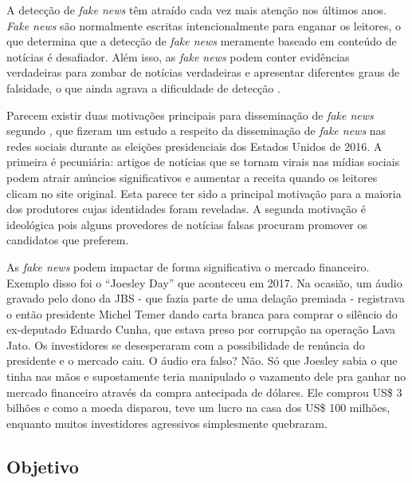 A  detecção de \textit{fake news} têm atraído cada vez mais atenção nos últimos anos. \textit{Fake news} são normalmente escritas intencionalmente para enganar os leitores, o que determina que a detecção de \textit{fake news} meramente baseado em conteúdo de notícias é  desafiador.
Além isso, as \textit{fake news} podem conter evidências verdadeiras para zombar de notícias verdadeiras e apresentar diferentes graus de falsidade, o que ainda agrava a dificuldade de detecção \cite{karimi2018}. 

Parecem existir duas motivações principais para disseminação de \textit{fake news} segundo \citet{allcot2017}, que fizeram um estudo a respeito da disseminação de \textit{fake news} nas redes sociais durante as eleições presidenciais dos Estados Unidos de 2016. 
A primeira é pecuniária: artigos de notícias que se tornam virais nas mídias sociais podem atrair anúncios significativos e aumentar a receita quando os leitores clicam no site original. 
Esta parece ter sido a principal motivação para a maioria dos produtores cujas identidades foram reveladas. 
A segunda motivação é ideológica pois alguns provedores de notícias falsas procuram promover os candidatos que preferem. 

As \textit{fake news} podem impactar de forma significativa o mercado financeiro.
Exemplo disso foi o ``Joesley Day'' \cite{shs2020} que aconteceu em 2017. 
Na ocasião, um áudio gravado pelo dono da JBS - que fazia parte de uma delação premiada - registrava o então presidente Michel Temer dando carta branca para comprar o silêncio do ex-deputado Eduardo Cunha, que estava preso por corrupção na operação Lava Jato.
Os investidores se desesperaram com a possibilidade de renúncia do presidente e o mercado caiu. 
O áudio era falso? Não. 
Só que Joesley sabia o que tinha nas mãos e supostamente teria manipulado o vazamento dele pra ganhar no mercado financeiro através da compra antecipada de dólares. 
Ele comprou US\$ 3 bilhões e como a moeda disparou, teve um lucro na casa dos US\$ 100 milhões, enquanto muitos investidores agressivos simplesmente quebraram.

\subsection{Objetivo}


